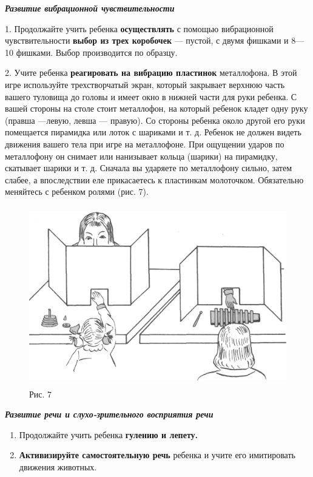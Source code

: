 \documentclass[a5paper]{book}
\renewcommand{\emph}[1]{\textit{#1}}
\begin{document}
\emph{\textbf{Развитие вибрационной чувствительности}}

1. Продолжайте учить ребенка \textbf{осуществлять} с помощью
вибрационной чувствительности \textbf{выбор из трех коробочек} ---
пустой, с двумя фишками и 8---10 фишками. Выбор производится по образцу.

2. Учите ребенка \textbf{реагировать на вибрацию пластинок} металлофона.
В этой игре используйте трехстворчатый экран, который закрывает верхнюю
часть вашего туловища до головы и имеет окно в нижней части для руки
ребенка. С вашей стороны на столе стоит металлофон, на который ребенок
кладет одну руку (правша ---левую, левша --- правую). Со стороны ребенка
около другой его руки помещается пирамидка или лоток с шариками и т. д.
Ребенок не должен видеть движения вашего тела при игре на металлофоне.
При ощущении ударов по металлофону он снимает или нанизывает кольца
(шарики) на пирамидку, скатывает шарики и т. д. Сначала вы ударяете по
металлофону сильно, затем слабее, а впоследствии еле прикасаетесь к
пластинкам молоточком. Обязательно меняйтесь с ребенком ролями (рис. 7).

\begin{figure}
\centering
\includegraphics[width=4.66667in,height=3.07361in]{media/media/image7.jpg}
\caption*{Рис. 7}
\end{figure}

\emph{\textbf{Развитие речи и слухо-зрительного восприятия речи}}

\begin{enumerate}
\def\labelenumi{\arabic{enumi}.}
\item
  
  Продолжайте учить ребенка \textbf{гулению и лепету.}
  
\item
  
  \textbf{Активизируйте самостоятельную речь} ребенка и учите его
  имитировать движения животных.
  
\end{enumerate}
\end{document}
